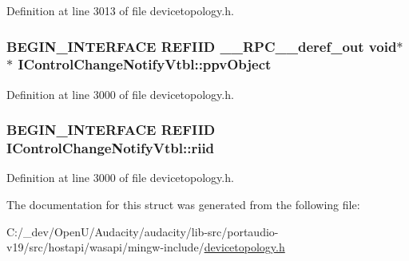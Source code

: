 Definition at line 3013 of file devicetopology.\+h.

\subsubsection[{\texorpdfstring{ppv\+Object}{ppvObject}}]{\setlength{\rightskip}{0pt plus 5cm}B\+E\+G\+I\+N\+\_\+\+I\+N\+T\+E\+R\+F\+A\+CE {\bf R\+E\+F\+I\+ID} {\bf \+\_\+\+\_\+\+R\+P\+C\+\_\+\+\_\+deref\+\_\+out} {\bf void}$\ast$$\ast$ I\+Control\+Change\+Notify\+Vtbl\+::ppv\+Object}\hypertarget{struct_i_control_change_notify_vtbl_a69c4e0f9d8299aa987902e8de476011a}{}\label{struct_i_control_change_notify_vtbl_a69c4e0f9d8299aa987902e8de476011a}


Definition at line 3000 of file devicetopology.\+h.

\subsubsection[{\texorpdfstring{riid}{riid}}]{\setlength{\rightskip}{0pt plus 5cm}B\+E\+G\+I\+N\+\_\+\+I\+N\+T\+E\+R\+F\+A\+CE {\bf R\+E\+F\+I\+ID} I\+Control\+Change\+Notify\+Vtbl\+::riid}\hypertarget{struct_i_control_change_notify_vtbl_a22dd95409feac7775717b97ad63a6cb1}{}\label{struct_i_control_change_notify_vtbl_a22dd95409feac7775717b97ad63a6cb1}


Definition at line 3000 of file devicetopology.\+h.



The documentation for this struct was generated from the following file\+:\begin{DoxyCompactItemize}
\item 
C\+:/\+\_\+dev/\+Open\+U/\+Audacity/audacity/lib-\/src/portaudio-\/v19/src/hostapi/wasapi/mingw-\/include/\hyperlink{devicetopology_8h}{devicetopology.\+h}\end{DoxyCompactItemize}
